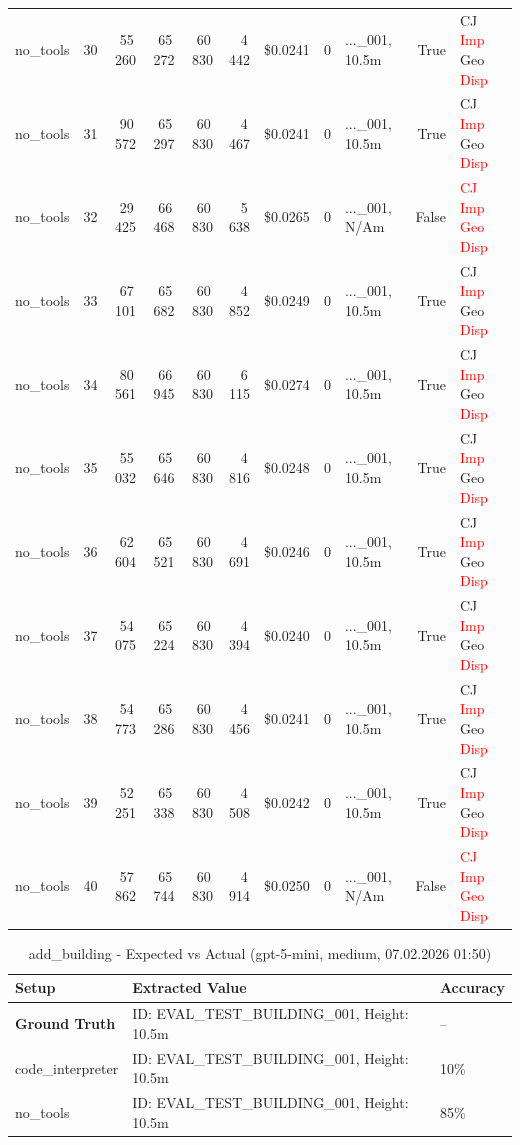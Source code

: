 \documentclass[a4paper,11pt]{article}
\begin{document}
\begin{table}[H]
{\begin{tabular}{l r r r r r r r l r l}
no\_tools & 30 & 55\,260 & 65\,272 & 60\,830 & 4\,442 & \$0.0241 & 0 & ...\_001, 10.5m & True & CJ \textcolor{red}{Imp} Geo \textcolor{red}{Disp} \\
no\_tools & 31 & 90\,572 & 65\,297 & 60\,830 & 4\,467 & \$0.0241 & 0 & ...\_001, 10.5m & True & CJ \textcolor{red}{Imp} Geo \textcolor{red}{Disp} \\
no\_tools & 32 & 29\,425 & 66\,468 & 60\,830 & 5\,638 & \$0.0265 & 0 & ...\_001, N/Am & False & \textcolor{red}{CJ} \textcolor{red}{Imp} \textcolor{red}{Geo} \textcolor{red}{Disp} \\
no\_tools & 33 & 67\,101 & 65\,682 & 60\,830 & 4\,852 & \$0.0249 & 0 & ...\_001, 10.5m & True & CJ \textcolor{red}{Imp} Geo \textcolor{red}{Disp} \\
no\_tools & 34 & 80\,561 & 66\,945 & 60\,830 & 6\,115 & \$0.0274 & 0 & ...\_001, 10.5m & True & CJ \textcolor{red}{Imp} Geo \textcolor{red}{Disp} \\
no\_tools & 35 & 55\,032 & 65\,646 & 60\,830 & 4\,816 & \$0.0248 & 0 & ...\_001, 10.5m & True & CJ \textcolor{red}{Imp} Geo \textcolor{red}{Disp} \\
no\_tools & 36 & 62\,604 & 65\,521 & 60\,830 & 4\,691 & \$0.0246 & 0 & ...\_001, 10.5m & True & CJ \textcolor{red}{Imp} Geo \textcolor{red}{Disp} \\
no\_tools & 37 & 54\,075 & 65\,224 & 60\,830 & 4\,394 & \$0.0240 & 0 & ...\_001, 10.5m & True & CJ \textcolor{red}{Imp} Geo \textcolor{red}{Disp} \\
no\_tools & 38 & 54\,773 & 65\,286 & 60\,830 & 4\,456 & \$0.0241 & 0 & ...\_001, 10.5m & True & CJ \textcolor{red}{Imp} Geo \textcolor{red}{Disp} \\
no\_tools & 39 & 52\,251 & 65\,338 & 60\,830 & 4\,508 & \$0.0242 & 0 & ...\_001, 10.5m & True & CJ \textcolor{red}{Imp} Geo \textcolor{red}{Disp} \\
no\_tools & 40 & 57\,862 & 65\,744 & 60\,830 & 4\,914 & \$0.0250 & 0 & ...\_001, N/Am & False & \textcolor{red}{CJ} \textcolor{red}{Imp} \textcolor{red}{Geo} \textcolor{red}{Disp} \\
\bottomrule
\end{tabular}}
\end{table}

\begin{table}[H]
\centering
\scriptsize
\caption{add\_building - Expected vs Actual (gpt-5-mini, medium, 07.02.2026 01:50)}
\begin{tabular}{l l l}
\toprule
Setup & Extracted Value & Accuracy \\
\midrule
\textbf{Ground Truth} & ID: EVAL\_TEST\_BUILDING\_001, Height: 10.5m & -- \\
\midrule
code\_interpreter & ID: EVAL\_TEST\_BUILDING\_001, Height: 10.5m & 10\% \\
no\_tools & ID: EVAL\_TEST\_BUILDING\_001, Height: 10.5m & 85\% \\
\bottomrule
\end{tabular}
\end{table}

\clearpage
\end{document}
